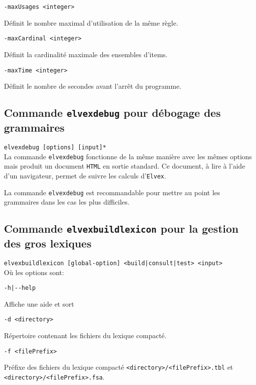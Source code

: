 \documentclass[11pt]{article}
\begin{document}
\begin{description}
\item \verb#-maxUsages <integer>#

  Définit le nombre maximal d'utilisation de la même règle.

\item \verb#-maxCardinal <integer>#

  Définit la cardinalité maximale des ensembles d'items.

\item \verb#-maxTime <integer>#

  Définit le nombre de secondes avant l'arrêt du programme.

\end{description}

\subsection{Commande \texttt{elvexdebug} pour débogage des grammaires}

\noindent
\verb#elvexdebug [options] [input]*#\\

La commande \texttt{elvexdebug} fonctionne de la même manière avec les
mêmes options mais produit un document \texttt{HTML} en sortie
standard. Ce document, à lire à l'aide d'un navigateur, permet de suivre les calculs
d'\texttt{Elvex}. 

La commande \texttt{elvexdebug} est recommandable pour mettre au
point les grammaires dans les cas les plus difficiles.

\subsection{Commande \texttt{elvexbuildlexicon} pour la gestion des
  gros lexiques}

\noindent
\verb#elvexbuildlexicon [global-option] <build|consult|test> <input>#\\

 Où les options sont:

\begin{description}
\item \verb#-h|--help#

Affiche une aide et sort

\item \verb#-d <directory>#

  Répertoire contenant les fichiers du lexique compacté.

\item \verb#-f <filePrefix>#

  Préfixe des fichiers du lexique compacté \verb#<directory>/<filePrefix>.tbl# et \verb#<directory>/<filePrefix>.fsa#.
  
\end{description}
\end{document}
